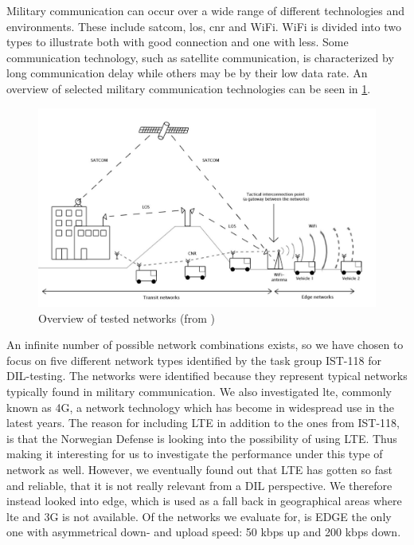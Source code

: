 Military communication can occur over a wide range of different technologies and
environments. These include \gls{satcom}, \gls{los},
\gls{cnr} and WiFi. WiFi is divided into two types to illustrate both
with good connection and one with less. Some communication technology, such as
satellite communication, is characterized by long communication delay while
others may be by their low data rate. An overview of selected military
communication technologies can be seen in \cref{figure-networks-overview}.

\begin{figure}[h]
\includegraphics[scale=0.25]{images/networks_overview.pdf}
\caption{Overview of tested networks (from \cite{krog-pisa})}
\label{figure-networks-overview}
\end{figure}

An infinite number of possible network combinations exists, so we have chosen to
focus on five different network types identified by the task group IST-118 for
DIL-testing. The networks were identified because they represent typical
networks typically found in military communication. We also investigated
\gls{lte}, commonly known as 4G, a network technology which has become in
widespread use in the latest years. The reason for including LTE in addition to
the ones from IST-118, is that the Norwegian Defense is looking into the
possibility of using LTE. Thus making it interesting for us to investigate the
performance under this type of network as well. However, we eventually found out
that LTE has gotten so fast and reliable, that it is not really relevant from a
DIL perspective. We therefore instead looked into \gls{edge}, which is used as a
fall back in geographical areas where \gls{lte} and 3G is not available. Of the
networks we evaluate for, is EDGE the only one with asymmetrical down- and
upload speed: 50 kbps up and 200 kbps down.

